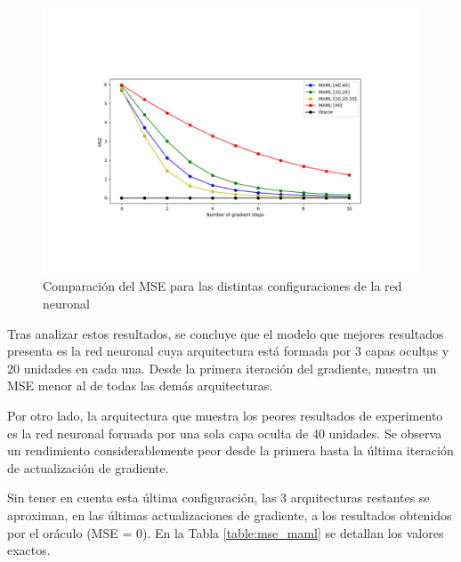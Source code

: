 \begin{figure}[H]
\begin{center}
 \includegraphics[width=0.8\linewidth]{Figuras/MAML/MSE.pdf}
\end{center}
\caption{Comparación del MSE para las distintas configuraciones de la red neuronal}
 \label{fig:mse_nnet}
\end{figure}

Tras analizar estos resultados, se concluye que el modelo que mejores resultados presenta es la red neuronal cuya arquitectura está formada por 3 capas ocultas y 20 unidades en cada una. Desde la primera iteración del gradiente, muestra un MSE menor al de todas las demás arquitecturas.

Por otro lado, la arquitectura que muestra los peores resultados de experimento es la red neuronal formada por una sola capa oculta de 40 unidades. Se observa un rendimiento considerablemente peor desde la primera hasta la última iteración de actualización de gradiente.

Sin tener en cuenta esta última configuración, las 3 arquitecturas restantes se aproximan, en las últimas actualizaciones de gradiente, a los resultados obtenidos por el oráculo (MSE = 0). En la Tabla \ref{table:mse_maml} se detallan los valores exactos.

\begin{table}[H]
\centering
{}%
\caption{MSE para las diferentes arquitucturas y cada una de las actualizaciones de gradiente.}\label{table:mse_maml}
\end{table}


